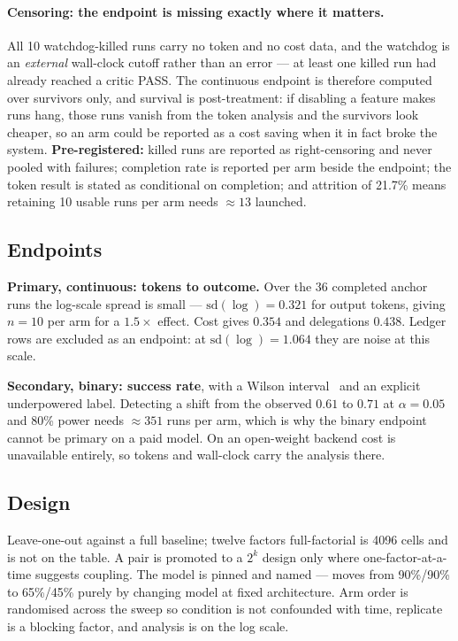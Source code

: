 \paragraph{Censoring: the endpoint is missing exactly where it matters.}
All 10 watchdog-killed runs carry no token and no cost data, and the watchdog
is an \emph{external} wall-clock cutoff rather than an error --- at least one
killed run had already reached a critic PASS. The continuous endpoint is
therefore computed over survivors only, and survival is post-treatment: if
disabling a feature makes runs hang, those runs vanish from the token analysis
and the survivors look cheaper, so an arm could be reported as a cost saving
when it in fact broke the system. \textbf{Pre-registered:} killed runs are
reported as right-censoring and never pooled with failures; completion rate is
reported per arm beside the endpoint; the token result is stated as conditional
on completion; and attrition of 21.7\% means retaining 10 usable runs per arm
needs $\approx 13$ launched.

\subsection{Endpoints}

\textbf{Primary, continuous: tokens to outcome.} Over the 36 completed anchor
runs the log-scale spread is small --- $\mathrm{sd}(\log)=0.321$ for output
tokens, giving $n=10$ per arm for a $1.5\times$ effect. Cost gives $0.354$ and
delegations $0.438$. Ledger rows are excluded as an endpoint: at
$\mathrm{sd}(\log)=1.064$ they are noise at this scale.

\textbf{Secondary, binary: success rate}, with a Wilson
interval~\cite{wilson1927} and an explicit underpowered label. Detecting a
shift from the observed $0.61$ to $0.71$ at $\alpha=0.05$ and 80\% power needs
$\approx 351$ runs per arm, which is why the binary endpoint cannot be primary
on a paid model. On an open-weight backend cost is unavailable entirely, so
tokens and wall-clock carry the analysis there.

\subsection{Design}

Leave-one-out against a full baseline; twelve factors full-factorial is 4096
cells and is not on the table. A pair is promoted to a $2^k$ design only where
one-factor-at-a-time suggests coupling. The model is pinned and named ---
\cite{abaqusagent2026} moves from 90\%/90\% to 65\%/45\% purely by changing
model at fixed architecture. Arm order is randomised across the sweep so
condition is not confounded with time, replicate is a blocking factor, and
analysis is on the log scale.

